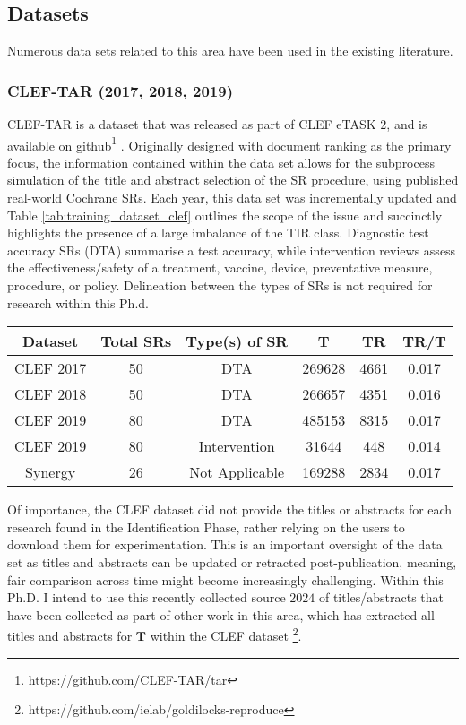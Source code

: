 \documentclass[../main.tex]{subfiles}
\begin{document}
\subsection{Datasets}
Numerous data sets related to this area have been used in the existing literature.

\subsubsection{CLEF-TAR (2017, 2018, 2019)}

CLEF-TAR is a dataset that was released as part of CLEF eTASK 2, and is available on github\footnote{https://github.com/CLEF-TAR/tar} \cite{kanoulas_clef_2017, kanoulas_clef_2018, kanoulas_clef_2019}. Originally designed with document ranking as the primary focus, the information contained within the data set allows for the subprocess simulation of the title and abstract selection of the SR procedure, using published real-world Cochrane SRs. Each year, this data set was incrementally updated and Table \ref{tab:training_dataset_clef} outlines the scope of the issue and succinctly highlights the presence of a large imbalance of the TIR class. Diagnostic test accuracy SRs (DTA) summarise a test accuracy, while intervention reviews assess the effectiveness/safety of a treatment, vaccine, device, preventative measure, procedure, or policy. Delineation between the types of SRs is not required for research within this Ph.d.


\begin{table*}
    \centering
    \begin{tabular}{|c|c|c|c|c|c|}
    \hline
        Dataset & Total SRs & Type(s) of SR & T & TR & TR/T\\   \hline
        CLEF 2017 & 50 & DTA & 269628 & 4661  & 0.017 \\   \hline
        CLEF 2018 & 50 & DTA & 266657 & 4351 & 0.016\\   \hline
             CLEF   2019 & 80 & DTA & 485153 & 8315 & 0.017\\   \hline
               CLEF  2019 & 80 & Intervention & 31644 &  448 & 0.014 \\   \hline
Synergy & 26 & Not Applicable & 169288 &  2834 & 0.017 \\   \hline
    \end{tabular}
    \caption{Training Dataset sizes for the TAR datasets}
    \label{tab:training_dataset_clef}
\end{table*}

Of importance, the CLEF dataset did not provide the titles or abstracts for each research found in the Identification Phase, rather relying on the users to download them for experimentation. This is an important oversight of the data set as titles and abstracts can be updated or retracted post-publication, meaning, fair comparison across time might become increasingly challenging. Within this Ph.D. I intend to use this recently collected source \(2024\) of titles/abstracts that have been collected as part of other work in this area, which has extracted all titles and abstracts for \(\textbf{T}\) within the CLEF dataset \cite{goharian_reproducibility_2024}\footnote{https://github.com/ielab/goldilocks-reproduce}.
\end{document}
